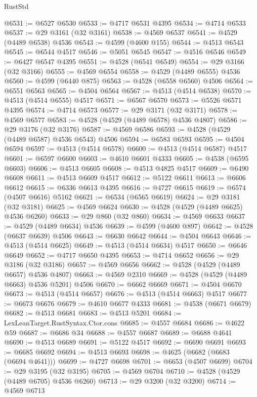 \begin{lexlean}{RustStd}
\begin{coremodule}
@6531 := @6527 @6530
@6533 := @4717 @6531 @4395
@6534 := @4714 @6533
@6537 := @29 @3161 (@32 @3161)
@6538 := @4569 @6537
@6541 := @4529 (@4489 @6538) @4536
@6543 := @4599 (@4600 @155)
@6544 := @4513 @6543
@6545 := @6544 @4517
@6546 := @5051 @6545
@6547 := @4516 @6546
@6549 := @6427 @6547 @4395
@6551 := @4528 (@6541 @6549)
@6554 := @29 @3166 (@32 @3166)
@6555 := @4569 @6554
@6558 := @4529 (@4489 @6555) @4536
@6560 := @4599 (@6440 @875)
@6563 := @4528 (@6558 @6560) @4506
@6564 := @6551 @6563
@6565 := @4504 @6564
@6567 := @4513 (@4514 @6538)
@6570 := @4513 (@4514 @6555) @4517
@6571 := @6567 @6570
@6573 := @5526 @6571 @4395
@6574 := @4714 @6573
@6577 := @29 @3171 (@32 @3171)
@6578 := @4569 @6577
@6583 := @4528 (@4529 (@4489 @6578) @4536 @4807)
@6586 := @29 @3176 (@32 @3176)
@6587 := @4569 @6586
@6593 := @4528 (@4529 (@4489 @6587) @4536 @6543) @4506
@6594 := @6583 @6593
@6595 := @4504 @6594
@6597 := @4513 (@4514 @6578)
@6600 := @4513 (@4514 @6587) @4517
@6601 := @6597 @6600
@6603 := @4610 @6601 @4333
@6605 := @4538 (@6595 @6603)
@6606 := @4513 @6605
@6608 := @4513 @4825 @4517
@6609 := @6490 @6608
@6611 := @4513 @6609 @4517
@6612 := @5122 @6611
@6613 := @6606 @6612
@6615 := @6336 @6613 @4395
@6616 := @4727 @6615
@6619 := @6574 (@4507 @6616) @5162
@6621 := @6534 (@6565 @6619)
@6624 := @29 @3181 (@32 @3181)
@6625 := @4569 @6624
@6630 := @4528 (@4529 (@4489 @6625) @4536 @6260)
@6633 := @29 @860 (@32 @860)
@6634 := @4569 @6633
@6637 := @4529 (@4489 @6634) @4536
@6639 := @4599 (@4600 @897)
@6642 := @4528 (@6637 @6639) @4506
@6643 := @6630 @6642
@6644 := @4504 @6643
@6646 := @4513 (@4514 @6625)
@6649 := @4513 (@4514 @6634) @4517
@6650 := @6646 @6649
@6652 := @4717 @6650 @4395
@6653 := @4714 @6652
@6656 := @29 @3186 (@32 @3186)
@6657 := @4569 @6656
@6662 := @4528 (@4529 (@4489 @6657) @4536 @4807)
@6663 := @4569 @2310
@6669 := @4528 (@4529 (@4489 @6663) @4536 @5201) @4506
@6670 := @6662 @6669
@6671 := @4504 @6670
@6673 := @4513 (@4514 @6657)
@6676 := @4513 (@4514 @6663) @4517
@6677 := @6673 @6676
@6679 := @4610 @6677 @4333
@6681 := @4538 (@6671 @6679)
@6682 := @4513 @6681
@6683 := @4513 @5201
@6684 := LexLeanTarget.RustSyntax.Ctor.cons
@6685 := @4557 @6684
@6686 := @4622 @59
@6687 := @6686 @34
@6688 := @4557 @6687
@6689 := @6688 @4641
@6690 := @4513 @6689
@6691 := @5122 @4517
@6692 := @6690 @6691
@6693 := @6685 @6692
@6694 := @4513 @6693
@6698 := @4625 (@6682 (@6683 (@6694 @4641)))
@6699 := @4727 @6698
@6701 := @6653 (@4507 @6699)
@6704 := @29 @3195 (@32 @3195)
@6705 := @4569 @6704
@6710 := @4528 (@4529 (@4489 @6705) @4536 @6260)
@6713 := @29 @3200 (@32 @3200)
@6714 := @4569 @6713

\end{coremodule}
\end{lexlean}
